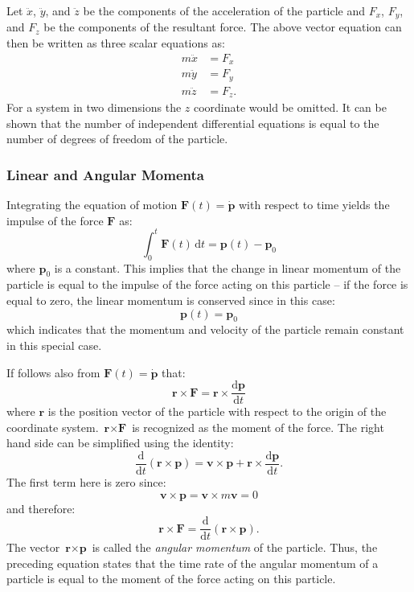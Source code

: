 Let $\ddot{x}$, $\ddot{y}$, and $\ddot{z}$ be the components of the acceleration of the particle and $F_x$, $F_y$, and $F_z$ be the components of the resultant force. The above vector equation can then be written as three scalar equations as:
\begin{align*}
  m \ddot{x} &= F_x \\
  m \ddot{y} &= F_y \\
  m \ddot{z} &= F_z
.\end{align*}
For a system in two dimensions the $z$ coordinate would be omitted. It can be shown that the number of independent differential equations is equal to the number of degrees of freedom of the particle.

\subsubsection{Linear and Angular Momenta}
Integrating the equation of motion $\textbf{F}(t) = \dot{\textbf{p}}$ with respect to time yields the impulse of the force $\textbf{F}$ as:
\[ 
\int_{0}^{t} \textbf{F}(t) \, \mathrm{d}t = \textbf{p}(t) - \textbf{p}_0
\]
where $\textbf{p}_0$ is a constant. This implies that the change in linear momentum of the particle is equal to the impulse of the force acting on this particle -- if the force is equal to zero, the linear momentum is conserved since in this case:
\[ 
\textbf{p}(t) = \textbf{p}_0
\]
which indicates that the momentum and velocity of the particle remain constant in this special case.

If follows also from $\textbf{F}(t) = \dot{\textbf{p}}$ that:
\[ 
\textbf{r} \times \textbf{F} = \textbf{r} \times \frac{\mathrm{d}\textbf{p}}{\mathrm{d}t} 
\]
where $\textbf{r}$ is the position vector of the particle with respect to the origin of the coordinate system. $\textbf{r} \times \textbf{F}$ is recognized as the moment of the force. The right hand side can be simplified using the identity:
\[ 
\frac{\mathrm{d}}{\mathrm{d}t} \left( \textbf{r} \times \textbf{p} \right) = \textbf{v} \times \textbf{p} + \textbf{r} \times \frac{\mathrm{d}\textbf{p}}{\mathrm{d}t} 
.\]
The first term here is zero since:
\[ 
\textbf{v} \times \textbf{p} = \textbf{v} \times m \textbf{v} = 0
\]
and therefore:
\[ 
\textbf{r} \times \textbf{F} = \frac{\mathrm{d}}{\mathrm{d}t} \left( \textbf{r} \times \textbf{p} \right)
.\]
The vector $\textbf{r} \times \textbf{p}$ is called the \textit{angular momentum} of the particle. Thus, the preceding equation states that the time rate of the angular momentum of a particle is equal to the moment of the force acting on this particle.

